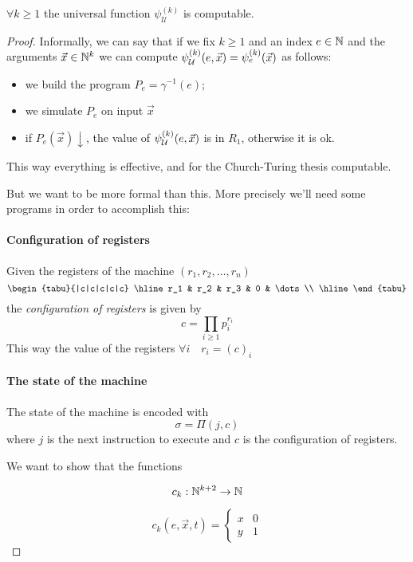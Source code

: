 \begin{theorem}
  $\forall k \geq 1$ the universal function $\psi_{\mathcal{U}}^{(k)}$
  is computable.

  \begin{proof}
    Informally, we can say that if we fix $k \geq 1$ and an index
    $e \in \mathbb{N}$ and the arguments $\vec{x} \in \mathbb{N}^k$ we can compute
    $\psi_{\mathcal{U}}^{(k)} (e, \vec{x}) = \psi_e^{(k)} (\vec{x})$ as follows:
    \begin{itemize}
    \item we build the program $P_e = \gamma^{-1}(e)$;
    \item we simulate $P_e$ on input $\vec{x}$
    \item if $P_e(\vec{x})\downarrow$, the value of $\psi_{\mathcal{U}}^{(k)} (e, \vec{x})$ is in
      $R_1$, otherwise it is ok.
    \end{itemize}
    This way everything is effective, and for the Church-Turing
    thesis computable.

    But we want to be more formal than this. More precisely we'll need
    some programs in order to accomplish this:

    \paragraph{Configuration of registers}
    Given the registers of the machine $(r_1, r_2, \dots, r_n)$
    \[
      \begin{tabu}{|c|c|c|c|c}
        \hline
        r_1 & r_2 & r_3 & 0 & \dots \\ \hline
      \end{tabu}
    \]
    the \textit{configuration of registers} is given by
    \[ c = \prod_{i \geq 1} p_i^{r_i} \]
    This way the value of the registers $\forall i \quad r_i = (c)_i$

    \paragraph{The state of the machine}
    The state of the machine is encoded with \[ \sigma = \Pi(j, c) \]
    where $j$ is the next instruction to execute and $c$ is the
    configuration of registers.

    We want to show that the functions

    \[
      c_k : \mathbb{N}^{k+2} \rightarrow \mathbb{N}
    \]

    \[
      c_k(e, \vec{x}, t) = \begin{cases}
        x & 0 \\
        y & 1
      \end{cases}
    \]


\end{proof}
\end{theorem}
